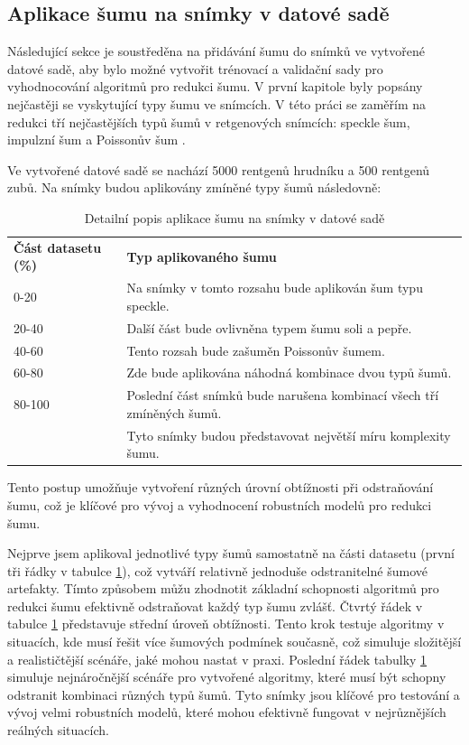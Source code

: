 \documentclass[male,czech,api_ing]{thesis}
\begin{document}
\subsection{Aplikace šumu na snímky v datové sadě}
Následující sekce je soustředěna na přidávání šumu do snímků ve vytvořené datové sadě, aby bylo možné vytvořit trénovací a validační sady pro vyhodnocování algoritmů pro redukci šumu. V první kapitole byly popsány nejčastěji se vyskytující typy šumu ve snímcích. V této práci se zaměřím na redukci tří nejčastějších typů šumů v retgenových snímcích: speckle šum, impulzní šum a Poissonův šum \cite{MostCommonNoises}.

Ve vytvořené datové sadě se nachází 5000 rentgenů hrudníku a 500 rentgenů zubů. Na snímky budou aplikovány zmíněné typy šumů následovně:

\begin{table}[H]
    \caption{Detailní popis aplikace šumu na snímky v datové sadě}
    \label{table:noiseTypes}
    \begin{tabular}{@{}ll@{}}
        \textbf{Část datasetu (\%)} & \textbf{Typ aplikovaného šumu} \\
        0-20   & Na snímky v tomto rozsahu bude aplikován šum typu speckle. \\
        20-40  & Další část bude ovlivněna typem šumu soli a pepře. \\
        40-60  & Tento rozsah bude zašuměn Poissonův šumem. \\
        60-80  & Zde bude aplikována náhodná kombinace dvou typů šumů. \\
        80-100 & Poslední část snímků bude narušena kombinací všech tří zmíněných šumů. \\ 
               & Tyto snímky budou představovat největší míru komplexity šumu. \\
    \end{tabular}
\end{table}

Tento postup umožňuje vytvoření různých úrovní obtížnosti při odstraňování šumu, což je klíčové pro vývoj a vyhodnocení robustních modelů pro redukci šumu.

Nejprve jsem aplikoval jednotlivé typy šumů samostatně na části datasetu (první tři řádky v tabulce \ref{table:noiseTypes}), což vytváří relativně jednoduše odstranitelné šumové artefakty. Tímto způsobem můžu zhodnotit základní schopnosti algoritmů pro redukci šumu efektivně odstraňovat každý typ šumu zvlášť. Čtvrtý řádek v tabulce \ref{table:noiseTypes} představuje střední úroveň obtížnosti. Tento krok testuje algoritmy v situacích, kde musí řešit více šumových podmínek současně, což simuluje složitější a realističtější scénáře, jaké mohou nastat v praxi. Poslední řádek tabulky \ref{table:noiseTypes} simuluje nejnáročnější scénáře pro vytvořené algoritmy, které musí být schopny odstranit kombinaci různých typů šumů. Tyto snímky jsou klíčové pro testování a vývoj velmi robustních modelů, které mohou efektivně fungovat v nejrůznějších reálných situacích.
\end{document}

